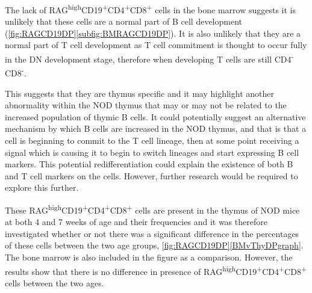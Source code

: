 

The lack of RAG\textsuperscript{high}CD19\textsuperscript{+}CD4\textsuperscript{+}CD8\textsuperscript{+} cells in the bone marrow suggests it is unlikely that these cells are a normal part of B cell development (\cref{fig:RAGCD19DP}\ref{subfig:BMRAGCD19DP}). %
It is also unlikely that they are a normal part of T cell development as T cell commitment is thought to occur fully in the DN development stage, therefore when developing T cells are still CD4\textsuperscript{-}CD8\textsuperscript{-}.

This suggests that they are thymus specific and it may highlight another abnormality within the NOD thymus that may or may not be related to the increased population of thymic B cells.
It could potentially suggest an alternative mechanism by which B cells are increased in the NOD thymus, and that is that a cell is beginning to commit to the T cell lineage, then at some point receiving a signal which is causing it to begin to switch lineages and start expressing B cell markers.
This potential redifferentiation could explain the existence of both B and T cell markers on the cells. 
However, further research would be required to explore this further.

These RAG\textsuperscript{high}CD19\textsuperscript{+}CD4\textsuperscript{+}CD8\textsuperscript{+} cells are present in the thymus of NOD mice at both 4 and 7 weeks of age and their frequencies   and it was therefore investigated whether or not there was a significant difference in the percentages of these cells between the two age groups, \cref{fig:RAGCD19DP}\ref{BMvThyDPgraph}. 
The bone marrow is also included in the figure as a comparison.
However, the results show that there is no difference in presence of RAG\textsuperscript{high}CD19\textsuperscript{+}CD4\textsuperscript{+}CD8\textsuperscript{+} cells between the two ages. 


